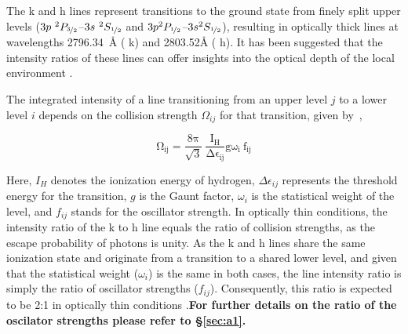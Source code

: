 The   k and h lines represent transitions to the ground state from finely split upper levels ($3p~^{2}P_{\nicefrac{3}{2}}${--}$3s~^{2}S_{\nicefrac{1}{2}}$ and $3p ^{2}P_{\nicefrac{1}{2}}${--}$3s^{2}S_{\nicefrac{1}{2}}$), resulting in optically thick lines at wavelengths 2796.34~{\AA} (  k) and 2803.52{\AA} (  h). It has been suggested that the intensity ratios of these lines can offer insights into the optical depth of the local environment \citep{kerr15}.

The integrated intensity of a line transitioning from an upper level $j$ to a lower level $i$ depends on the collision strength $\Omega_{ij}$ for that transition, given by~\citep{henri62,mariska92},

\begin{equation}
\mathrm{\Omega_{ij}=\frac{8\pi}{\sqrt{3}}~\frac{I_{H}}{\Delta \epsilon_{ij}}g\omega_{i}~f_{ij}}
\end{equation}

Here, $I_{H}$ denotes the ionization energy of hydrogen, $\Delta \epsilon_{ij}$ represents the threshold energy for the transition, $g$ is the Gaunt factor, $\omega_{i}$ is the statistical weight of the level, and $f_{ij}$ stands for the oscillator strength. In optically thin conditions, the intensity ratio of the k to h line equals the ratio of collision strengths, as the escape probability of photons is unity. As the   k and h lines share the same ionization state and originate from a transition to a shared lower level, and given that the statistical weight ($\omega_{i}$) is the same in both cases, the line intensity ratio is simply the ratio of oscillator strengths ($f_{ij}$). Consequently, this ratio is expected to be 2:1 in optically thin conditions \citep{kerr15,levens19}.{\bf For further details on the ratio of the oscilator strengths please refer to \S\ref{sec:a1}.}

